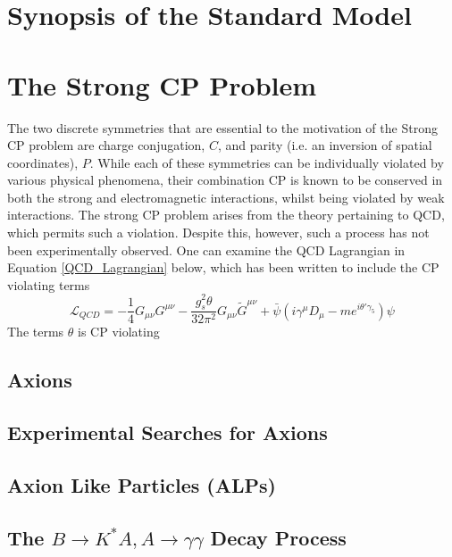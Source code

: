 \section{Synopsis of the Standard Model}
\section{The Strong CP Problem}The two discrete symmetries that are essential to the motivation of the Strong CP problem are charge conjugation, $C$, and parity (i.e. an inversion of spatial coordinates), $P$. While each
of these symmetries can be individually violated by various physical phenomena, their combination CP is known to be conserved in both the strong and electromagnetic interactions, whilst being violated by weak interactions. The strong CP problem arises from the theory pertaining to QCD, which
permits such a violation. Despite this, however, such a process has not been experimentally observed. One can examine the QCD Lagrangian in Equation \ref{QCD_Lagrangian} below, which has been written to include the CP violating terms
\begin{equation}\label{QCD_Lagrangian}
    \mathcal{L}_{QCD} = -\frac{1}{4}G_{\mu\nu}G^{\mu\nu}-\frac{g_{s}^{2}\theta}{32\pi^{2}}G_{\mu\nu}\tilde{G}^{\mu\nu}+\bar{\psi}(i\gamma^{\mu}D_{\mu}-me^{i\theta'\gamma_{5}})\psi
\end{equation}
The terms $\theta$ is CP violating


\subsection{Axions}
\subsection{Experimental Searches for Axions}
\subsection{Axion Like Particles (ALPs)}
\subsection{The $B\rightarrow K^{*}A, A\rightarrow\gamma\gamma$ Decay Process}